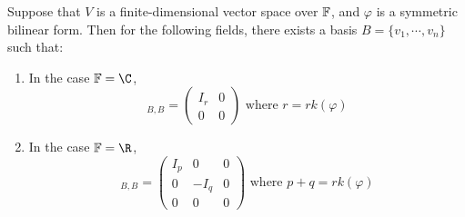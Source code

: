 \documentclass[../Main.tex]{subfiles}
\begin{document}
\begin{corollary}
    Suppose that $V$ is a finite-dimensional vector space over $\mathbb{F}$, and $\varphi$ is a symmetric bilinear form. Then for the following fields, there exists a basis $B = \{v_1, \cdots, v_n\}$ such that:
    \begin{enumerate}
        \item In the case $\F = \C$,
            \begin{equation*}
                [\varphi]_{B, B} = \begin{pmatrix}
                    I_r & 0 \\
                    0 & 0
                \end{pmatrix}
                \text{ where } r = rk(\varphi)
            \end{equation*}
        \item In the case $\F = \R$,
            \begin{equation*}
                [\varphi]_{B,B} =
                \begin{pmatrix}
                    I_p & 0 & 0 \\
                    0 & -I_q & 0 \\
                    0 & 0 & 0
                \end{pmatrix}
                \text{ where } p + q = rk(\varphi)
            \end{equation*}
    \end{enumerate}
    \label{corBFNiceDiag}
\end{corollary}
\end{document}
